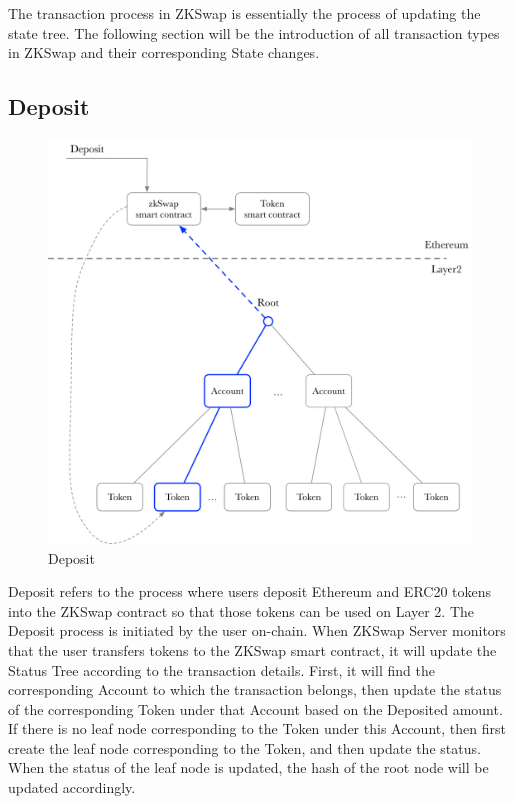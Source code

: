 \documentclass[]{template/llncs}
\begin{document}
The transaction process in ZKSwap is essentially the process of updating the state tree. The following section will be the introduction of all transaction types in ZKSwap and their corresponding State changes.

\subsection{Deposit}

\begin{figure}[htbp]
\centering
\includegraphics[width=0.9\columnwidth]{figure/deposit}
\caption{Deposit}
\label{fig:deposit}
\end{figure}

Deposit refers to the process where users deposit Ethereum and ERC20 tokens into the ZKSwap contract so that those tokens can be used on Layer 2. The Deposit process is initiated by the user on-chain. When ZKSwap Server monitors that the user transfers tokens to the ZKSwap smart contract, it will update the Status Tree according to the transaction details. First, it will find the corresponding Account to which the transaction belongs, then update the status of the corresponding Token under that Account based on the Deposited amount. If there is no leaf node corresponding to the Token under this Account, then first create the leaf node corresponding to the Token, and then update the status. When the status of the leaf node is updated, the hash of the root node will be updated accordingly.
\end{document}

